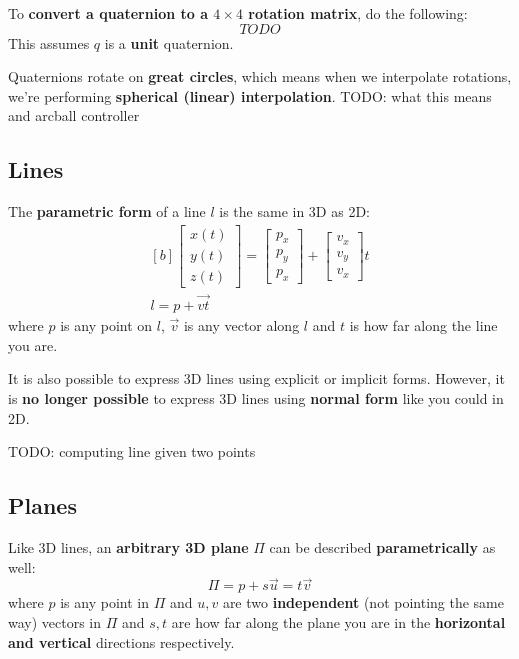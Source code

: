 \documentclass{article}
\begin{document}
To \textbf{convert a quaternion to a $4 \times 4$ rotation matrix}, do the following:
\begin{equation}
	TODO
\label{eq:quat-to-matrix}
\end{equation}
This assumes $q$ is a \textbf{unit} quaternion.

Quaternions rotate on \textbf{great circles}, which means when we interpolate rotations, we're performing \textbf{spherical (linear) interpolation}. TODO: what this means and arcball controller

\subsection{Lines}

The \textbf{parametric form} of a line $l$ is the same in 3D as 2D:
\begin{equation}
	\begin{aligned}[b]
	\left[ \begin{matrix} x(t) \\ y(t) \\ z(t) \end{matrix} \right] =
	\left[ \begin{matrix} p_x \\ p_y \\ p_x \end{matrix} \right]
	+
	\left[ \begin{matrix} v_x \\ v_y \\ v_x \end{matrix} \right]
	t
	\\
	l = p + \vec{vt}
	\end{aligned}
	\label{eq:parametric-3d-line}
\end{equation}
where $p$ is any point on $l$, $\vec{v}$ is any vector along $l$ and $t$ is how far along the line you are.

It is also possible to express 3D lines using explicit or implicit forms. However, it is \textbf{no longer possible} to express 3D lines using \textbf{normal form} like you could in 2D.

TODO: computing line given two points

\subsection{Planes}

Like 3D lines, an \textbf{arbitrary 3D plane} $\Pi$ can be described \textbf{parametrically} as well:
\begin{equation}
	\Pi = p + s\vec{u} = t\vec{v}
	\label{eq:parametric-3d-plane}
\end{equation}
where $p$ is any point in $\Pi$ and $u,v$ are two \textbf{independent} (not pointing the same way) vectors in $\Pi$ and $s,t$ are how far along the plane you are in the \textbf{horizontal and vertical} directions respectively.
\end{document}
